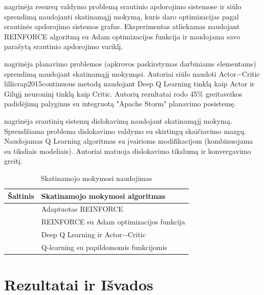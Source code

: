 \documentclass{VUMIFPSbakalaurinis}
\begin{document}
\cite{ni2019generalizable} nagrinėja resursų valdymo problemą srautinio apdorojimo sistemose ir siūlo sprendimą naudojanti skatinamąjį mokymą, kuris daro optimizacijas pagal srautinės apdorojimo sistemos grafus. Eksperimentas atliekamas naudojant REINFORCE \cite{williams1992simple} algoritmą su Adam optimizacijos funkcija \cite{kingma2014adam} ir naudojama savo parašytą srautinio apdorojimo variklį. 

\cite{Li2018Model} nagrinėja planavimo problemos (apkrovos paskirstymas darbiniams elementams) sprendimą naudojant skatinamąjį mokymąsi. Autoriai siūlo naudoti Actor−Critic {lillicrap2015continuous} metodą naudojant Deep Q Learning  \cite{mnih2015human} tinklą kaip Actor ir Gilųjį neuroninį tinklą kaip Critic. Autorių rezultatai rodo 45\% greitaveikos padidėjimą palyginus su integruotą "Apache Storm" planavimo posistemę. 

\cite{Russo2019Reinforcement} nagrinėja srautinių sistemų dislokavimą naudojant skatinamąjį mokymą. Sprendžiama problema dislokavimo valdymo su skirtingų skaičiavimo mazgų. Naudojamas Q Learning algoritmas su įvairioms modifikacijom (kombinuojama su tiksliais modeliais). Autoriai matuoja dislokavimo tikslumą ir konvergavimo greitį. 

\begin{table}[H]
    \begin{tabular}{|l|l|}
    \hline
    Šaltinis                         & Skatinamojo mokymosi algoritmas    \\ \hline
    \cite{vaquero2018autotuning}     & Adaptuotas REINFORCE \cite{williams1992simple}        \\ \hline
    \cite{ni2019generalizable}       & REINFORCE \cite{williams1992simple}  su Adam optimizacijos funkcija \cite{kingma2014adam}     \\ \hline
    \cite{Li2018Model}               & Deep Q Learning \cite{mnih2015human} ir Actor−Critic \cite{lillicrap2015continuous} \\ \hline
    \cite{Russo2019Reinforcement}    & Q-learning \cite{mnih2015human} su papildomomis funkcijomis \\ \hline
    \end{tabular}
    \caption{Skatinamojo mokymosi naudojimas}
    \label{ml-in-stream}
\end{table}


\section{Rezultatai ir Išvados}
\end{document}
